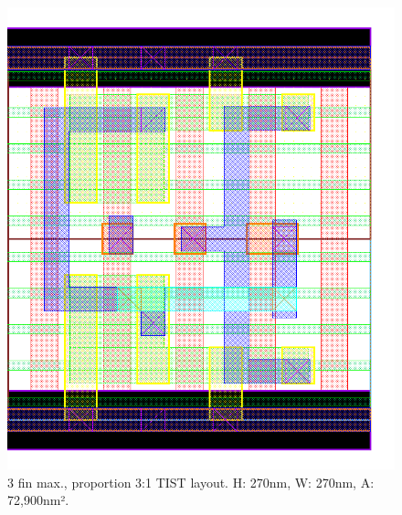 \documentclass[diss,pgmicro,english]{iiufrgs}
\begin{document}
\begin{figure}[]
\centering
\includegraphics[width=\textwidth,height=\textheight,keepaspectratio]{TIST3F1F.png}
\caption{3 fin max., proportion 3:1 TIST layout. H: 270nm, W: 270nm, A: 72,900nm².}
\label{fig:TIST2F}
\end{figure}
\end{document}
